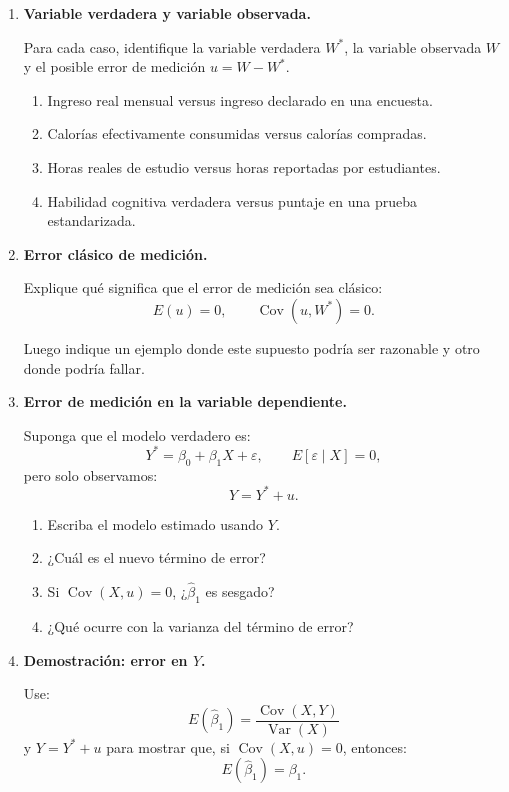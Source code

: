 \documentclass[11pt]{article}
\begin{document}
\begin{enumerate}[label=\textbf{Ejercicio \arabic*.}, leftmargin=*]

\item \textbf{Variable verdadera y variable observada.}

Para cada caso, identifique la variable verdadera $W^*$, la variable observada $W$ y el posible error de medición $u=W-W^*$.

\begin{enumerate}[label=\alph*)]
    \item Ingreso real mensual versus ingreso declarado en una encuesta.
    \item Calorías efectivamente consumidas versus calorías compradas.
    \item Horas reales de estudio versus horas reportadas por estudiantes.
    \item Habilidad cognitiva verdadera versus puntaje en una prueba estandarizada.
\end{enumerate}

\item \textbf{Error clásico de medición.}

Explique qué significa que el error de medición sea clásico:
\[
E(u)=0,\qquad \operatorname{Cov}(u,W^*)=0.
\]

Luego indique un ejemplo donde este supuesto podría ser razonable y otro donde podría fallar.

\item \textbf{Error de medición en la variable dependiente.}

Suponga que el modelo verdadero es:
\[
Y^*=\beta_0+\beta_1X+\varepsilon,
\qquad E[\varepsilon\mid X]=0,
\]
pero solo observamos:
\[
Y=Y^*+u.
\]

\begin{enumerate}[label=\alph*)]
    \item Escriba el modelo estimado usando $Y$.
    \item ¿Cuál es el nuevo término de error?
    \item Si $\operatorname{Cov}(X,u)=0$, ¿$\hat{\beta}_1$ es sesgado?
    \item ¿Qué ocurre con la varianza del término de error?
\end{enumerate}

\item \textbf{Demostración: error en $Y$.}

Use:
\[
E(\hat{\beta}_1)=\frac{\operatorname{Cov}(X,Y)}{\operatorname{Var}(X)}
\]
y $Y=Y^*+u$ para mostrar que, si $\operatorname{Cov}(X,u)=0$, entonces:
\[
E(\hat{\beta}_1)=\beta_1.
\]


\end{enumerate}
\end{document}
